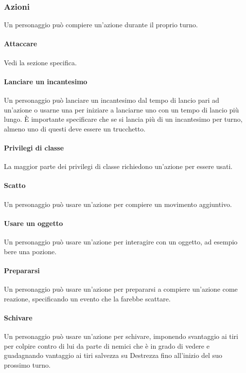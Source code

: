 \subsubsection{Azioni}
Un personaggio può compiere un'azione durante il proprio turno.\\
\paragraph{Attaccare} Vedi la sezione specifica.\\
\paragraph{Lanciare un incantesimo} Un personaggio può lanciare un incantesimo dal tempo di lancio pari ad un'azione o usarne una per iniziare a lanciarne uno con un tempo di lancio più lungo. È importante specificare che se si lancia più di un incantesimo per turno, almeno uno di questi deve essere un trucchetto.\\
\paragraph{Privilegi di classe}
La maggior parte dei privilegi di classe richiedono un'azione per essere usati.\\
\paragraph{Scatto}
Un personaggio può usare un'azione per compiere un movimento aggiuntivo.\\
\paragraph{Usare un oggetto}
Un personaggio può usare un'azione per interagire con un oggetto, ad esempio bere una pozione.\\
\paragraph{Prepararsi}
Un personaggio può usare un'azione per prepararsi a compiere un'azione come reazione, specificando un evento che la farebbe scattare.\\
\paragraph{Schivare}
Un personaggio può usare un'azione per schivare, imponendo svantaggio ai tiri per colpire contro di lui da parte di nemici che è in grado di vedere e guadagnando vantaggio ai tiri salvezza su Destrezza fino all'inizio del suo prossimo turno.\\
